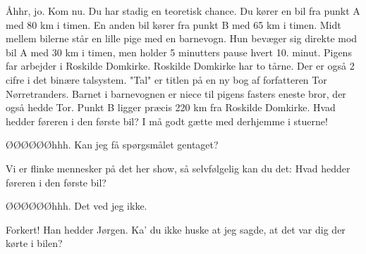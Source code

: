 \documentclass[10pt]{article}
\begin{document}
\begin{sketch}
 Åhhr, jo. Kom nu. Du har stadig en teoretisk chance.
Du kører en bil fra punkt A med 80 km i
timen.  En anden bil kører fra punkt B med 65 km i timen. Midt mellem
bilerne står en lille pige med en barnevogn. Hun bevæger sig direkte mod
bil A med 30 km i timen, men holder 5 minutters pause hvert 10. minut.
Pigens far arbejder i Roskilde Domkirke. Roskilde Domkirke har to tårne.
Der er også 2 cifre i det binære talsystem. "Tal" er titlen på en ny bog af
forfatteren Tor Nørretranders. Barnet i barnevognen er niece til pigens
fasters eneste bror, der også hedde Tor. Punkt B ligger præcis 220 km fra
Roskilde Domkirke. Hvad hedder føreren i den første bil?  I må godt gætte med derhjemme i stuerne!

 ØØØØØØhhh. Kan jeg få spørgsmålet gentaget?

 Vi er flinke mennesker på det her show, så selvfølgelig
kan du det: Hvad hedder føreren i den første bil?

 ØØØØØØhhh. Det ved jeg ikke.

 Forkert! Han hedder Jørgen. Ka' du ikke huske at jeg sagde,
at det var dig der kørte i bilen?


\end{sketch}
\end{document}
